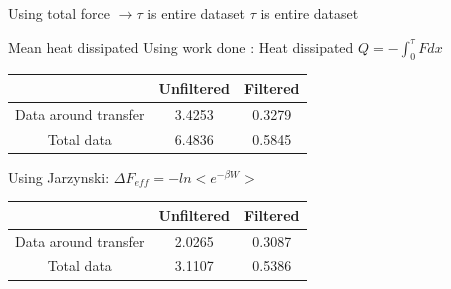 \documentclass{beamer}
\begin{document}
\begin{frame}{Using total force $\rightarrow \tau$ is entire dataset}
$\tau$ is entire dataset
\begin{table}[h!]
\end{table}

\end{frame}

\begin{frame}{Mean heat dissipated}
Using work done : Heat dissipated $Q=-\int_{0}^{\tau} Fdx$
\begin{center} 
\begin{tabular}{| c | c | c |} 
\hline  & Unfiltered & Filtered \\ 
\hline Data around transfer & 3.4253 & 0.3279  \\ 
\hline Total data & 6.4836 & 0.5845 \\ 
\hline 
\end{tabular} 
\end{center}

Using Jarzynski: $\Delta F_{eff}= -ln<e^{-\beta W}>$
\begin{center} 
\begin{tabular}{| c | c | c |} 
\hline  & Unfiltered & Filtered \\ 
\hline Data around transfer & 2.0265 & 0.3087  \\ 
\hline Total data & 3.1107 & 0.5386 \\ 
\hline 
\end{tabular} 
\end{center}


\end{frame}
\end{document}
